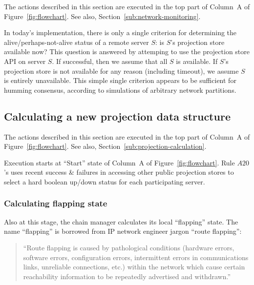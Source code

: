 \documentclass[preprint,10pt]{sigplanconf}
\begin{document}
The actions described in this section are executed in the top part of
Column~A of Figure~\ref{fig:flowchart}.
See also, Section~\ref{sub:network-monitoring}.

In today's implementation, there is only a single criterion for
determining the alive/perhaps-not-alive status of a remote server $S$:
is $S$'s projection store available now?  This question is answered by
attemping to use the projection store API on server $S$.  
If successful, then we assume that all
$S$ is available.  If $S$'s projection store is not available for any
reason (including timeout), we assume $S$ is entirely unavailable.
This simple single
criterion appears to be sufficient for humming consensus, according to
simulations of arbitrary network partitions.


\subsection{Calculating a new projection data structure}
\label{sub:humming-projection-calculation}

The actions described in this section are executed in the top part of
Column~A of Figure~\ref{fig:flowchart}.
See also, Section~\ref{sub:projection-calculation}.

Execution starts at ``Start'' state of Column~A of
Figure~\ref{fig:flowchart}.  Rule $A20$'s uses recent success \&
failures in accessing other public projection stores to select a hard
boolean up/down status for each participating server.

\subsubsection{Calculating flapping state}

Also at this stage, the chain manager calculates its local
``flapping'' state.  The name ``flapping'' is borrowed from IP network
engineer jargon ``route flapping'':

\begin{quotation}
``Route flapping is caused by pathological conditions
(hardware errors, software errors, configuration errors, intermittent
errors in communications links, unreliable connections, etc.) within
the network which cause certain reachability information to be
repeatedly advertised and withdrawn.''  \cite{wikipedia-route-flapping}
\end{quotation}
\end{document}
